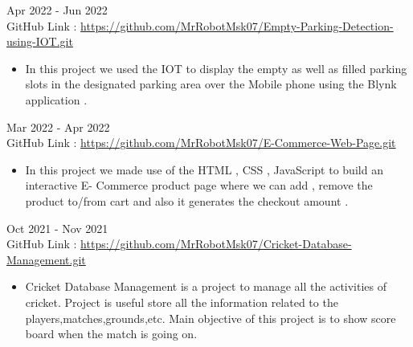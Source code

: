 \documentclass[a4paper,10pt]{memoir} %
\begin{document}


{Apr 2022 - Jun 2022}\\
{GitHub Link : \href{https://github.com/MrRobotMsk07/Empty-Parking-Detection-using-IOT.git}{https://github.com/MrRobotMsk07/Empty-Parking-Detection-using-IOT.git}}
\clearpage %

\framebreak
\framebreak

\begin{itemize}
    \item In this project we used the IOT to display the empty as well as filled parking slots in          the designated parking area over the Mobile phone using the Blynk application .\\
\end{itemize}



{Mar 2022 - Apr 2022}\\
{GitHub Link : \href{https://github.com/MrRobotMsk07/E-Commerce-Web-Page.git}{https://github.com/MrRobotMsk07/E-Commerce-Web-Page.git}}
\begin{itemize}
    \item In this project we made use of the HTML , CSS , JavaScript to build an interactive E-            Commerce product page where we can add , remove the product to/from cart and also it             generates the checkout amount .\\
\end{itemize}


{Oct 2021 - Nov 2021}\\
{GitHub Link : \href{https://github.com/MrRobotMsk07/Cricket-Database-Management.git}{https://github.com/MrRobotMsk07/Cricket-Database-Management.git}}
\begin{itemize}
    \item Cricket Database Management is a project to manage all the activities of cricket. Project        is useful store all the information related to the players,matches,grounds,etc. 
          Main objective of this project is to show score board when the match is going on.\\
\end{itemize}
\end{document}
